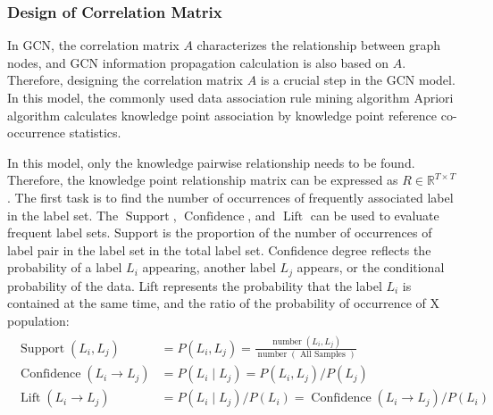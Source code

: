 \subsubsection{Design of Correlation Matrix}


In GCN, the correlation matrix \(A\) characterizes the relationship between graph nodes, and GCN information propagation calculation is also based on \(A\). Therefore, designing the correlation matrix \(A\) is a crucial step in the GCN model. In this model, the commonly used data association rule mining algorithm Apriori algorithm calculates knowledge point association by knowledge point reference co-occurrence statistics.

In this model, only the knowledge pairwise relationship needs to be found. Therefore, the knowledge point relationship matrix can be expressed as \(R\in \mathbb{R}^{T\times T}\). The first task is to find the number of occurrences of frequently associated label in the label set. The \(\operatorname{Support}\), \(\operatorname{Confidence}\), and \(\operatorname{Lift}\) can be used to evaluate frequent label sets. Support is the proportion of the number of occurrences of label pair in the label set in the total label set. Confidence degree reflects the probability of a label \(L_i\) appearing, another label \(L_j\) appears, or the conditional probability of the data. Lift represents the probability that the label \(L_i\) is contained at the same time, and the ratio of the probability of occurrence of X population:
\begin{align}
    \begin{split}
        \operatorname{Support}(L_i, L_j)       & =P(L_i,L_j)=\frac{\operatorname{number}(L_i,L_j)}{\operatorname{number}(\text{ All Samples })} \\
        \operatorname{Confidence}(L_i \to L_j) & =P(L_i \mid L_j)=P(L_i, L_j) / P(L_j)                                                \\
        \operatorname{Lift}(L_i \to L_j)       & =P(L_i \mid L_j) / P(L_i)=\operatorname{Confidence}(L_i \to L_j) / P(L_i)
    \end{split}
\end{align}

